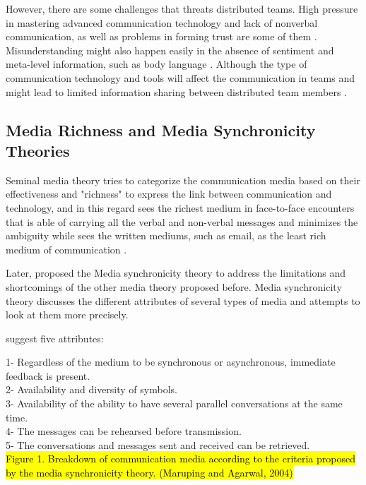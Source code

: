 However, there are some challenges that threats distributed teams. High pressure in mastering advanced communication technology and lack of nonverbal communication, as well as problems in forming trust are some of them \citep{Jarvenpaa1998,Kayworth2002}. Misunderstanding might also happen easily in the absence of sentiment and meta-level information, such as body language \citep{Cramton2001}. Although the type of communication technology and tools will affect the communication in teams and might lead to limited information sharing between distributed team members \citep{Gilson2015}.

\subsection{Media Richness and Media Synchronicity Theories}
Seminal media theory tries to categorize the communication media based on their effectiveness and "richness" to express the link between communication and technology, and in this regard sees the richest medium in face-to-face encounters that is able of carrying all the verbal and non-verbal messages and minimizes the ambiguity while sees the written mediums, such as email, as the least rich medium of communication \citep{Daft1986,Hassell2016}.

Later, \citet{Dennis2008} proposed the Media synchronicity theory to address the limitations and shortcomings of the other media theory proposed before. Media synchronicity theory discusses the different attributes of several types of media and attempts to look at them more precisely.

\citet{Dennis2008} suggest five attributes:

1- Regardless of the medium to be synchronous or asynchronous, immediate feedback is present.\\
2- Availability and diversity of symbols.\\
3- Availability of the ability to have several parallel conversations at the same time.\\
4- The messages can be rehearsed before transmission.\\
5- The conversations and messages sent and received can be retrieved.\\

\hl{Figure 1. Breakdown of communication media according to the criteria proposed by the media synchronicity theory. (Maruping and Agarwal, 2004) }

